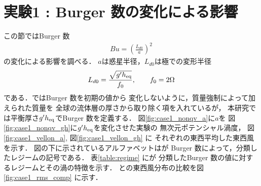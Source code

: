 \documentclass[a4j,12pt,openbib,oneside]{jreport}
\begin{document}
%
\clearpage
\newpage
\section{実験1 : Burger 数の変化による影響}
\label{sec:case1}
この節ではBurger 数 
\begin{align}
Bu = \left (\frac{L_{d0}}{a} \right )^2 \label{burger}
\end{align}
の変化による影響を調べる．
$a$は惑星半径，$L_{d0}$は極での変形半径
\begin{align}
L_{d0} = \frac{\sqrt{g'h_{{\rm{eq}}}}}{f_0}, \qquad f_0 = 2 \Omega
\end{align}
である．\cite{Brueshaber2019}ではBurger 数を初期の値から
変化しないように，質量強制によって加えられた質量を
全球の流体層の厚さから取り除く項を入れているが，
本研究では平衡厚さ$g'h_{{\rm{eq}}}$でBurger 数を定義する．
%
%
図\ref{fig:case1_nonqv_a}に$a$を
図\ref{fig:case1_nonqv_gh}に$g'h_{\rm{eq}}$を変化させた実験の
無次元ポテンシャル渦度，
図\ref{fig:case1_vellon_a}, 図\ref{fig:case1_vellon_gh} に
それぞれの東西平均した東西風を示す．
%
図の下に示されているアルファベットは\cite{Brueshaber2019}が
Burger 数によって，分類したレジームの記号である．
表\ref{table:regime} に\cite{Brueshaber2019}が
分類したBurger 数の値に対するレジームとその渦の特徴を示す．
\cite{Showman2007} との東西風分布の比較を図\ref{fig:case1_rms_comp} に示す．
%
%
%
%
%
%
% 
\end{document}
